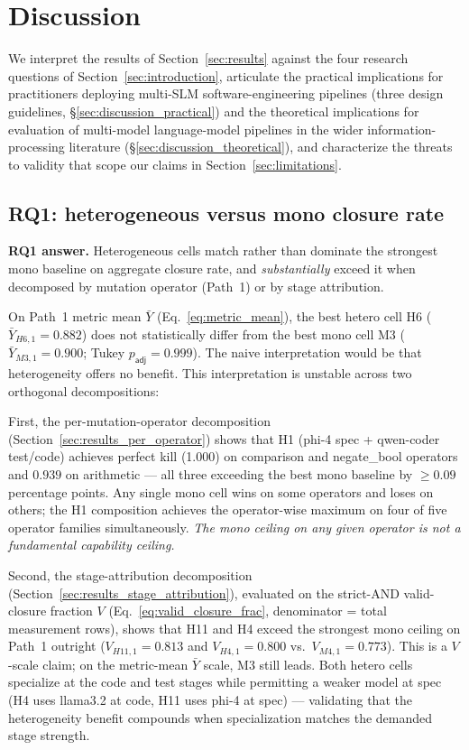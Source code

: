 \section{Discussion}
\label{sec:discussion}

We interpret the results of Section~\ref{sec:results} against the four research questions of Section~\ref{sec:introduction}, articulate the practical implications for practitioners deploying multi-SLM software-engineering pipelines (three design guidelines, \S\ref{sec:discussion_practical}) and the theoretical implications for evaluation of multi-model language-model pipelines in the wider information-processing literature (\S\ref{sec:discussion_theoretical}), and characterize the threats to validity that scope our claims in Section~\ref{sec:limitations}.

\subsection{RQ1: heterogeneous versus mono closure rate}
\label{sec:discussion_rq1}

\textbf{RQ1 answer.} Heterogeneous cells match rather than dominate the strongest mono baseline on aggregate closure rate, and \emph{substantially} exceed it when decomposed by mutation operator (Path~1) or by stage attribution.

On Path~1 metric mean $\bar{Y}$ (Eq.~\ref{eq:metric_mean}), the best hetero cell H6 ($\bar{Y}_{H6,1} = 0.882$) does not statistically differ from the best mono cell M3 ($\bar{Y}_{M3,1} = 0.900$; Tukey $p_{\textsf{adj}} = 0.999$). The naive interpretation would be that heterogeneity offers no benefit. This interpretation is unstable across two orthogonal decompositions:

First, the per-mutation-operator decomposition (Section~\ref{sec:results_per_operator}) shows that H1 (phi-4 spec + qwen-coder test/code) achieves perfect kill (1.000) on comparison and negate\_bool operators and $0.939$ on arithmetic --- all three exceeding the best mono baseline by $\geq 0.09$ percentage points. Any single mono cell wins on some operators and loses on others; the H1 composition achieves the operator-wise maximum on four of five operator families simultaneously. \emph{The mono ceiling on any given operator is not a fundamental capability ceiling.}

Second, the stage-attribution decomposition (Section~\ref{sec:results_stage_attribution}), evaluated on the strict-AND valid-closure fraction $V$ (Eq.~\ref{eq:valid_closure_frac}, denominator = total measurement rows), shows that H11 and H4 exceed the strongest mono ceiling on Path~1 outright ($V_{H11,1} = 0.813$ and $V_{H4,1} = 0.800$ vs.\ $V_{M4,1} = 0.773$). This is a $V$-scale claim; on the metric-mean $\bar{Y}$ scale, M3 still leads. Both hetero cells specialize at the code and test stages while permitting a weaker model at spec (H4 uses llama3.2 at code, H11 uses phi-4 at spec) --- validating that the heterogeneity benefit compounds when specialization matches the demanded stage strength.

